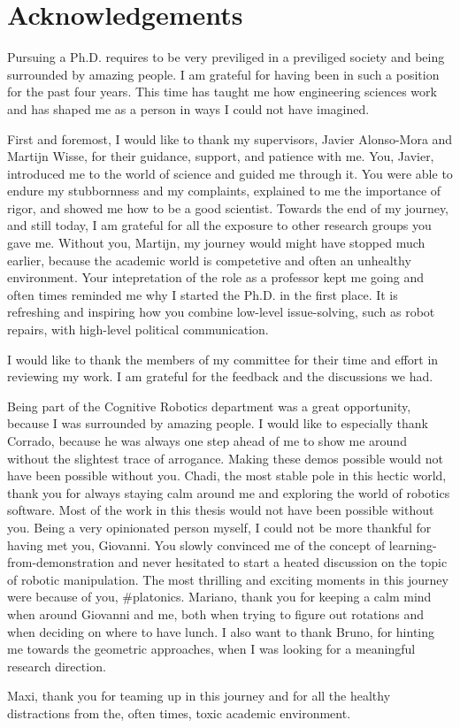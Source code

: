 \chapter*{Acknowledgements}
\label{acknowledgements}



Pursuing a Ph.D. requires to be very previliged in a previliged society and
being surrounded by amazing people. I am grateful for having been in such a
position for the past four years. This time has taught me how engineering
sciences work and has shaped me as a person in ways I could not have imagined.

First and foremost, I would like to thank my supervisors, Javier Alonso-Mora and
Martijn Wisse, for their guidance, support, and patience with me. You, Javier,
introduced me to the world of science and guided me through it. You were able to
endure my stubbornness and my complaints, explained to me the importance of
rigor, and showed me how to be a good scientist.
Towards the end of my
journey, and still today, I am grateful for all the exposure to other research
groups you gave me. Without you, Martijn, my journey would might have stopped
much earlier, because the academic world is competetive and often an unhealthy
environment. Your intepretation of the role as a professor kept me going and
often times reminded me why I started the Ph.D. in the first place. It is
refreshing and inspiring how you combine low-level issue-solving, such as robot
repairs, with high-level political communication.

I would like to thank the members of my committee for their time and effort in
reviewing my work. I am grateful for the feedback and the discussions we had.

Being part of the Cognitive Robotics department was a great opportunity, because
I was surrounded by amazing people. I would like to especially thank Corrado,
because he was always one step ahead of me to show me around without the
slightest trace of arrogance. Making these demos possible would not have been
possible without you. Chadi, the most stable pole in this hectic world, thank
you for always staying calm around me and exploring the world of
robotics software. Most of the work in this thesis would not have been possible
without you. Being a very opinionated person myself, I could not be more
thankful for having met you, Giovanni. You slowly convinced me of the concept of
learning-from-demonstration and never hesitated to start a heated discussion on
the topic of robotic manipulation. The most thrilling and exciting moments in
this journey were because of you, \#platonics. Mariano, thank you for keeping a
calm mind when around Giovanni and me, both when trying to figure out rotations
and when deciding on where to have lunch. I also want to thank Bruno, for
hinting me towards the geometric approaches, when I was looking for a meaningful
research direction.


Maxi, thank you for teaming up in this journey and for all the
healthy distractions from the, often times, toxic academic environment.


